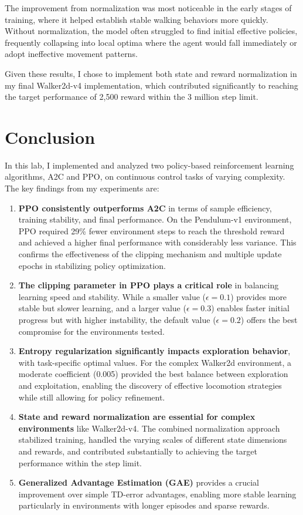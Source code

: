 \documentclass[a4paper,twocolumn]{article}
\begin{document}
The improvement from normalization was most noticeable in the early stages of training, where it helped establish stable walking behaviors more quickly. Without normalization, the model often struggled to find initial effective policies, frequently collapsing into local optima where the agent would fall immediately or adopt ineffective movement patterns.

Given these results, I chose to implement both state and reward normalization in my final Walker2d-v4 implementation, which contributed significantly to reaching the target performance of 2,500 reward within the 3 million step limit.

\section{Conclusion}

In this lab, I implemented and analyzed two policy-based reinforcement learning algorithms, A2C and PPO, on continuous control tasks of varying complexity. The key findings from my experiments are:

\begin{enumerate}
    \item \textbf{PPO consistently outperforms A2C} in terms of sample efficiency, training stability, and final performance. On the Pendulum-v1 environment, PPO required 29\% fewer environment steps to reach the threshold reward and achieved a higher final performance with considerably less variance. This confirms the effectiveness of the clipping mechanism and multiple update epochs in stabilizing policy optimization.
    
    \item \textbf{The clipping parameter in PPO plays a critical role} in balancing learning speed and stability. While a smaller value ($\epsilon=0.1$) provides more stable but slower learning, and a larger value ($\epsilon=0.3$) enables faster initial progress but with higher instability, the default value ($\epsilon=0.2$) offers the best compromise for the environments tested.
    
    \item \textbf{Entropy regularization significantly impacts exploration behavior}, with task-specific optimal values. For the complex Walker2d environment, a moderate coefficient (0.005) provided the best balance between exploration and exploitation, enabling the discovery of effective locomotion strategies while still allowing for policy refinement.
    
    \item \textbf{State and reward normalization are essential for complex environments} like Walker2d-v4. The combined normalization approach stabilized training, handled the varying scales of different state dimensions and rewards, and contributed substantially to achieving the target performance within the step limit.
    
    \item \textbf{Generalized Advantage Estimation (GAE)} provides a crucial improvement over simple TD-error advantages, enabling more stable learning particularly in environments with longer episodes and sparse rewards.
\end{enumerate}
\end{document}
